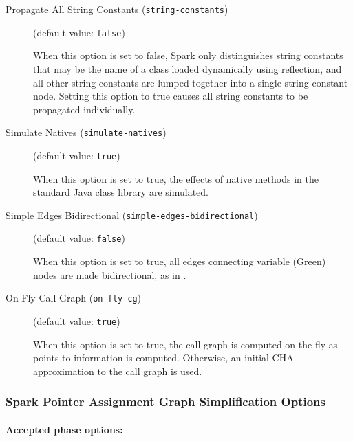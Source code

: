\documentclass{article}
\begin{document}
\begin{description}
\item[Propagate All String Constants ({\tt string-constants})]
(default value: {\tt false})




When this option is set to false, Spark only distinguishes string constants that
may be the name of a class loaded dynamically using reflection, and all other
string constants are lumped together into a single string constant node.
Setting this option to true causes all string constants to be propagated
individually.
        


\item[Simulate Natives ({\tt simulate-natives})]
(default value: {\tt true})




When this option is set to true, the effects of native methods in the standard Java class library are simulated.
        


\item[Simple Edges Bidirectional ({\tt simple-edges-bidirectional})]
(default value: {\tt false})




When this option is set to true, all edges connecting variable (Green)
nodes are made bidirectional, as in .
        


\item[On Fly Call Graph ({\tt on-fly-cg})]
(default value: {\tt true})




When this option is set to true, the call graph is computed on-the-fly
as points-to information is computed. Otherwise, an initial
CHA approximation to the call graph is used.
        


\end{description}

\subsubsection{Spark Pointer Assignment Graph Simplification Options}


\paragraph{Accepted phase options:} 
\end{document}
